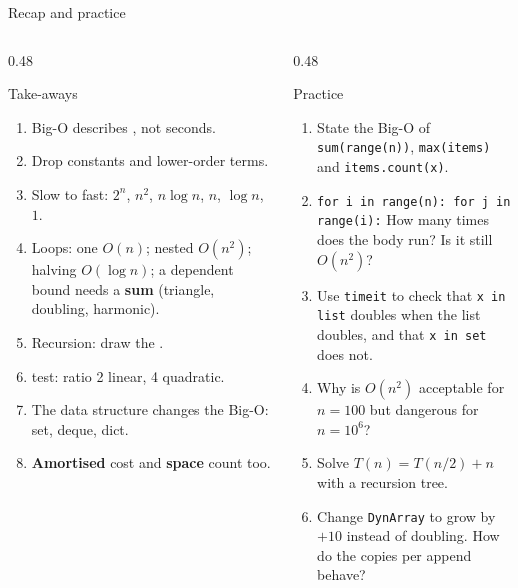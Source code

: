 \documentclass[aspectratio=169,10pt]{beamer}
\begin{document}
\begin{frame}{Recap and practice}
\begin{columns}[T]
\begin{column}{0.48\textwidth}
\begin{block}{Take-aways}
{\footnotesize
\begin{enumerate}\setlength\itemsep{2pt}
\item Big-O describes , not seconds.
\item Drop constants and lower-order terms.
\item Slow to fast: $2^n$, $n^2$, $n\log n$, $n$, $\log n$, $1$.
\item Loops: one $O(n)$; nested $O(n^2)$; halving $O(\log n)$; a dependent bound needs a \textbf{sum} (triangle, doubling, harmonic).
\item Recursion: draw the .
\item {} test: ratio 2 linear, 4 quadratic.
\item The data structure changes the Big-O: set, deque, dict.
\item \textbf{Amortised} cost and \textbf{space} count too.
\end{enumerate}}
\end{block}
\end{column}
\begin{column}{0.48\textwidth}
\begin{block}{Practice}
{\footnotesize
\begin{enumerate}\setlength\itemsep{2pt}
\item State the Big-O of \texttt{sum(range(n))}, \texttt{max(items)} and \texttt{items.count(x)}.
\item \texttt{for i in range(n): for j in range(i):} How many times does the body run? Is it still $O(n^2)$?
\item Use \texttt{timeit} to check that \texttt{x in list} doubles when the list doubles, and that \texttt{x in set} does not.
\item Why is $O(n^2)$ acceptable for $n=100$ but dangerous for $n=10^6$?
\item Solve $T(n)=T(n/2)+n$ with a recursion tree.
\item Change \texttt{DynArray} to grow by $+10$ instead of doubling. How do the copies per append behave?
\end{enumerate}}
\end{block}
\end{column}
\end{columns}
\end{frame}
\end{document}
